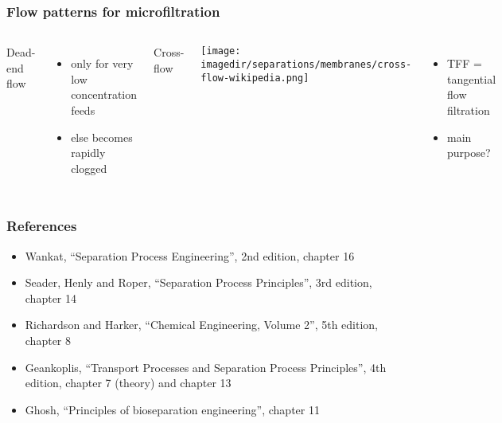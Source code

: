 \begin{frame}\frametitle{Flow patterns for microfiltration}
	\begin{columns}[t]
			Dead-end flow
			\begin{itemize}
				\item	only for very low concentration feeds
				\item	else becomes rapidly clogged
			\end{itemize}
			Cross-flow
			\begin{center}
				\texttt{[image: \\imagedir/separations/membranes/cross-flow-wikipedia.png]}
			\end{center}
			\begin{itemize}
				\item	TFF = tangential flow filtration
				\item	main purpose?
			\end{itemize}
	\end{columns}
	
\end{frame}

\begin{frame}\frametitle{References}
	\begin{itemize}
		\item	Wankat, ``Separation Process Engineering'', 2nd edition, chapter 16
		\item	Seader, Henly and Roper, ``Separation Process Principles'', 3rd edition, chapter 14
		\item	Richardson and Harker, ``Chemical Engineering, Volume 2'', 5th edition, chapter 8
		\item	Geankoplis, ``Transport Processes and Separation Process Principles'', 4th edition, chapter 7 (theory) and chapter 13
		\item	Ghosh, ``Principles of bioseparation engineering'', chapter 11
	\end{itemize}
\end{frame}

